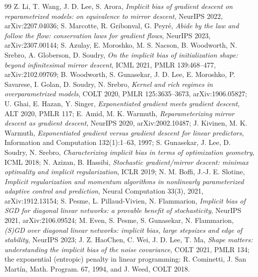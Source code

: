 \begin{thebibliography}{99}
Z. Li, T. Wang, J. D. Lee, S. Arora, \emph{Implicit bias of gradient descent on reparametrized models: on equivalence to
mirror descent}, NeurIPS 2022, arXiv:2207.04036;
S. Marcotte, R. Gribonval, G. Peyr\'e, \emph{Abide by the law and follow the flow: conservation laws for gradient
flows}, NeurIPS 2023, arXiv:2307.00144;
S. Azulay, E. Moroshko, M. S. Nacson, B. Woodworth, N. Srebro, A. Globerson, D. Soudry, \emph{On the implicit bias of
initialization shape: beyond infinitesimal mirror descent}, ICML 2021, PMLR 139:468--477, arXiv:2102.09769;
B. Woodworth, S. Gunasekar, J. D. Lee, E. Moroshko, P. Savarese, I. Golan, D. Soudry, N. Srebro, \emph{Kernel and rich
regimes in overparametrized models}, COLT 2020, PMLR 125:3635--3673, arXiv:1906.05827;
U. Ghai, E. Hazan, Y. Singer, \emph{Exponentiated gradient meets gradient descent}, ALT 2020, PMLR 117;
E. Amid, M. K. Warmuth, \emph{Reparameterizing mirror descent as gradient descent}, NeurIPS 2020, arXiv:2002.10487;
J. Kivinen, M. K. Warmuth, \emph{Exponentiated gradient versus gradient descent for linear predictors}, Information and
Computation 132(1):1--63, 1997;
S. Gunasekar, J. Lee, D. Soudry, N. Srebro, \emph{Characterizing implicit bias in terms of optimization geometry}, ICML
2018;
N. Azizan, B. Hassibi, \emph{Stochastic gradient/mirror descent: minimax optimality and implicit regularization}, ICLR
2019;
N. M. Boffi, J.-J. E. Slotine, \emph{Implicit regularization and momentum algorithms in nonlinearly parameterized
adaptive control and prediction}, Neural Computation 33(3), 2021, arXiv:1912.13154;
S. Pesme, L. Pillaud-Vivien, N. Flammarion, \emph{Implicit bias of SGD for diagonal linear networks: a provable benefit
of stochasticity}, NeurIPS 2021, arXiv:2106.09524;
M. Even, S. Pesme, S. Gunasekar, N. Flammarion, \emph{(S)GD over diagonal linear networks: implicit bias, large
stepsizes and edge of stability}, NeurIPS 2023;
J. Z. HaoChen, C. Wei, J. D. Lee, T. Ma, \emph{Shape matters: understanding the implicit bias of the noise covariance},
COLT 2021, PMLR 134;
the exponential (entropic) penalty in linear programming: R. Cominetti, J. San Mart\'in, Math. Program. 67, 1994, and
J. Weed, COLT 2018.


\end{thebibliography}
